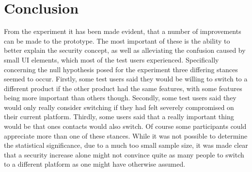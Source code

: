 \section{Conclusion}
From the experiment it has been made evident, that a number of improvements can be made to the prototype. The most important of these is the ability to better explain the security concept, as well as alleviating the confusion caused by small UI elements, which most of the test users experienced.
\noindent
Specifically concerning the null hypothesis posed for the experiment three differing stances seemed to occur. Firstly, some test users said they would be willing to switch to a different product if the other product had the same features, with some features being more important than others though. Secondly, some test users said they would only really consider switching if they had felt severely compromised on their current platform. Thirdly, some users said that a really important thing would be that ones contacts would also switch. Of course some participants could appreciate more than one of these stances.
\noindent
While it was not possible to determine the statistical significance, due to a much too small sample size, it was made clear that a security increase alone might not convince quite as many people to switch to a different platform as one might have otherwise assumed. 
